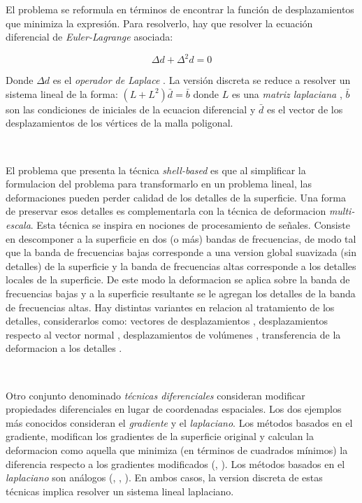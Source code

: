 \documentclass{article}
\begin{document}
El problema se reformula en términos de encontrar la función de 
desplazamientos que minimiza la expresión. Para resolverlo, hay 
que resolver la ecuación diferencial de \emph{Euler-Lagrange} asociada:

$$\Delta d + \Delta^2 d = 0$$

Donde $\Delta d$ es el \emph{operador de Laplace} \cite{E:1998}. La versión 
discreta se reduce a resolver un sistema lineal de la 
forma: $(L + L^2) \bar d = \bar b$ donde $L$ es una \emph{matriz laplaciana} 
\cite{B:2013}, $\bar b$ son las condiciones de iniciales de la ecuacion diferencial 
y $\bar d$ es el vector de los desplazamientos de los vértices de la malla 
poligonal.

\

El problema que presenta la técnica \emph{shell-based} es que al simplificar 
la formulacion del problema para transformarlo en un problema lineal, las 
deformaciones pueden perder calidad de los detalles de la superficie. Una 
forma de preservar esos detalles es complementarla con la técnica de deformacion 
\emph{multi-escala}. Esta técnica se inspira en nociones de procesamiento 
de señales. Consiste en descomponer a la superficie en dos (o más) bandas 
de frecuencias, de modo tal que la banda de frecuencias bajas corresponde 
a una version global suavizada (sin detalles) de la superficie y la banda 
de frecuencias altas corresponde a los detalles locales de la superficie. 
De este modo la deformacion se aplica sobre la banda de frecuencias bajas 
y a la superficie resultante se le agregan los detalles de la banda de 
frecuencias altas. Hay distintas variantes en relacion al tratamiento 
de los detalles, considerarlos como: vectores de desplazamientos \cite{K:1998}, 
desplazamientos respecto al vector normal \cite{K:1999}, desplazamientos de 
volúmenes \cite{BK:2003b}, transferencia de la deformacion a los detalles 
\cite{B:2006}.

\

Otro conjunto denominado \emph{técnicas diferenciales} consideran modificar 
propiedades diferenciales en lugar de coordenadas espaciales. Los dos ejemplos 
más conocidos consideran el \emph{gradiente} y el \emph{laplaciano}. Los 
métodos basados en el gradiente, modifican 
los gradientes de la superficie original y calculan la deformacion como  
aquella que minimiza (en términos de cuadrados mínimos) la diferencia respecto 
a los gradientes modificados (\cite{Y:2004}, \cite{Z:2005}). Los métodos 
basados en el \emph{laplaciano} son análogos (\cite{L:2004}, \cite{S:2004}, 
\cite{ZH:2005}). En ambos casos, la version discreta de estas técnicas implica 
resolver un sistema lineal laplaciano. 
\end{document}
